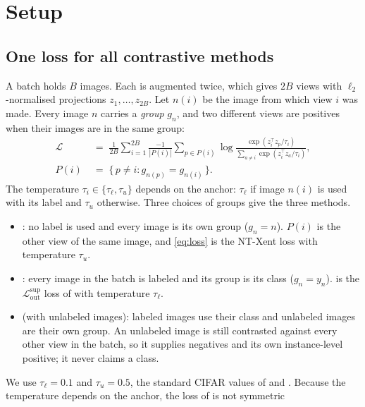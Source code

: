 \section{Setup}
\label{sec:setup}

\subsection{One loss for all contrastive methods}
A batch holds $B$ images. Each is augmented twice, which gives $2B$ views with $\ell_2$-normalised
projections $z_1,\dots,z_{2B}$. Let $n(i)$ be the image from which view $i$ was made. Every image $n$
carries a \emph{group} $g_n$, and two different views are positives when their images are in the same
group:
\begin{equation}
\label{eq:loss}
\begin{aligned}
\mathcal{L} &\;=\; \frac{1}{2B}\sum_{i=1}^{2B} \frac{-1}{|P(i)|}\sum_{p\in P(i)}
\log\frac{\exp(z_i^\top z_p/\tau_i)}{\sum_{a\neq i}\exp(z_i^\top z_a/\tau_i)},\\
P(i) &\;=\; \{\,p\neq i : g_{n(p)} = g_{n(i)}\,\}.
\end{aligned}
\end{equation}
The temperature $\tau_i\in\{\tau_\ell,\tau_u\}$ depends on the anchor: $\tau_\ell$ if image $n(i)$ is used
with its label and $\tau_u$ otherwise. Three choices of groups give the three methods.
\begin{itemize}[leftmargin=1.4em]
\item \textbf{\simclr} \citep{chen2020simclr}: no label is used and every image is its own group
($g_n=n$). $P(i)$ is the other view of the same image, and \cref{eq:loss} is the NT-Xent loss with
temperature $\tau_u$.
\item \textbf{\supcon} \citep{khosla2020supcon}: every image in the batch is labeled and its group is its
class ($g_n=y_n$).  is the $\mathcal{L}^{\mathrm{sup}}_{\mathrm{out}}$ loss of
\citet{khosla2020supcon} with temperature $\tau_\ell$.
\item \textbf{\union} (\supcon with unlabeled images): labeled images use their class and unlabeled images
are their own group. An unlabeled image is still contrasted against every other view in the batch, so it
supplies negatives and its own instance-level positive; it never claims a class.
\end{itemize}
We use $\tau_\ell=0.1$ and $\tau_u=0.5$, the standard CIFAR values of \supcon and \simclr
\citep{khosla2020supcon}. Because the temperature depends on the anchor, the loss of \union is not symmetric
